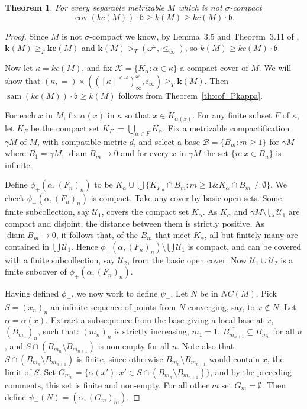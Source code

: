 \documentclass{article}
\newtheorem{thm}{Theorem}[section]
\newcommand{\tq}{\ge_T}
\newcommand{\gtq}{\ge_{T}}
\newcommand{\omom}{\omega^\omega}
\newcommand{\cl}[1]{\overline{#1}}
\begin{document}
\begin{thm}\label{th:k_sam}
   For every separable metrizable $M$ which is not $\sigma$-compact 
   \[\mathop{cov}(kc(M))\cdot\mathfrak{b} \ge k(M) \ge kc(M)\cdot\mathfrak{b}.\]   
\end{thm}
\begin{proof} Since $M$ is not $\sigma$-compact we know, by Lemma~3.5 and Theorem~3.11 of \cite{FG_Shape}, $\mathbf{k}(M) \gtq \mathbf{kc}(M)$ and $\mathbf{k}(M) >_T (\omom,\le_\infty)$, so $k(M) \ge kc(M)\cdot\mathfrak{b}$.

Now let $\kappa=kc(M)$, and fix  $\mathcal{K}=\{K_\alpha : \alpha \in \kappa\}$  a compact cover of $M$. We will show that $(\kappa,=) \times (\left( [\kappa]^{<\omega} \right)^{\omega}_{\infty},i_\infty) \tq \mathbf{k}(M)$. 
Then $\mathop{sam}(kc(M))\cdot\mathfrak{b} \ge k(M)$ follows from 
Theorem~\ref{th:cof_Pkappa}.

    For each $x$ in $M$, fix $\alpha(x)$ in $\kappa$ so that $x \in K_{\alpha(x)}$. For any finite subset $F$ of $\kappa$, let $K_F$ be the compact set $K_F:=\bigcup_{\alpha \in F} K_\alpha$. 
Fix a metrizable compactification $\gamma M$ of $M$, with compatible metric $d$, and select a base $\mathcal{B}=\{B_m : m \ge 1\}$ for $\gamma M$ where $B_1=\gamma M$, $\mathop{diam} B_m \to 0$ and for every $x$ in $\gamma M$ the set $\{n : x \in B_n\}$ is infinite.

    Define $\phi_+(\alpha, (F_n)_n)$ to be $K_\alpha \cup \bigcup \{ K_{F_m} \cap \cl{B_m} : m \ge 1 \& K_\alpha \cap \cl{B_m} \ne \emptyset\}$. 
We check  $\phi_+(\alpha,(F_n)_n)$ is compact. 
Take any cover by basic open sets. Some finite subcollection, say $\mathcal{U}_1$, covers the compact set $K_\alpha$. 
As $K_\alpha$ and $\gamma M \setminus \bigcup \mathcal{U}_1$ are compact and disjoint, the distance between them is strictly positive. 
As $\mathop{diam} B_m \to 0$, it follows that,  of the $\cl{B_m}$ that meet $K_\alpha$, all but finitely many  are contained in $\bigcup \mathcal{U}_1$. 
Hence $\phi_+(\alpha,(F_n)_n) \setminus \bigcup  \mathcal{U}_1$ is compact, and can be covered with a finite subcollection, say $\mathcal{U}_2$, from the basic open cover. Now $\mathcal{U}_1 \cup \mathcal{U}_2$ is a finite subcover of $\phi_+(\alpha,(F_n)_n)$.
    
Having defined $\phi_+$, we now work to define $\psi_-$. Let $N$ be in $NC(M)$. 
    Pick $S=(x_n)_n$ an infinite sequence of points from $N$ converging, say, to $x\notin N$. Let $\alpha=\alpha(x)$. Extract a subsequence from the  base giving a local base at $x$, $(B_{m_n})_n$, such that:  $(m_n)_n$ is strictly increasing, $m_1=1$,  $\cl{B_{m_{n+1}}} \subseteq B_{m_n}$ for all $n$, and $S \cap (\cl{B_{m_n}} \setminus B_{m_{n+1}})$ is non-empty for all $n$. Note also that $S \cap (\cl{B_{m_n}} \setminus B_{m_{n+1}})$ is finite, since otherwise $\cl{B_{m_n}} \setminus B_{m_{n+1}}$ would contain $x$, the limit of $S$. 
    Set $G_{m_n}=\{\alpha(x') : x' \in S \cap (\cl{B_{m_n}} \setminus B_{m_{n+1}})\}$, and by the preceding comments,  this set is finite and non-empty. 
    For all other $m$ set $G_m=\emptyset$. Then define $\psi_-(N) = (\alpha,(G_m)_m)$.


\end{proof}
\end{document}
